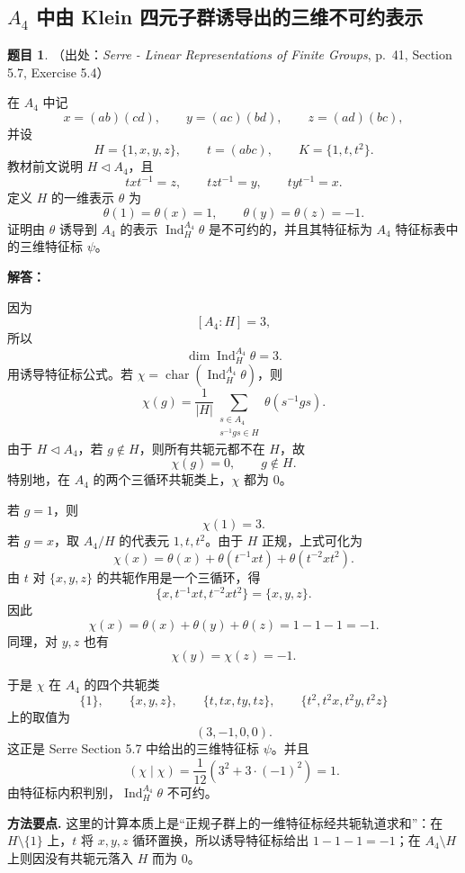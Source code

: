 \documentclass[a4paper]{ctexart}
\theoremstyle{definition}
\newtheorem{example}{题目}[section]
\theoremstyle{analysis}
\theoremstyle{plain}
\begin{document}
\subsection{\texorpdfstring{\(A_4\) 中由 Klein 四元子群诱导出的三维不可约表示}{A4 中由 Klein 四元子群诱导出的三维不可约表示}}\label{subsec:problem-serre-a4-induced-klein}

\begin{example}
（出处：\textit{Serre - Linear Representations of Finite Groups}, p.~41, Section 5.7, Exercise 5.4）

在 \(A_4\) 中记
\[
  x=(ab)(cd),\qquad y=(ac)(bd),\qquad z=(ad)(bc),
\]
并设
\[
  H=\{1,x,y,z\},\qquad t=(abc),\qquad K=\{1,t,t^2\}.
\]
教材前文说明 \(H\triangleleft A_4\)，且
\[
  txt^{-1}=z,\qquad tzt^{-1}=y,\qquad tyt^{-1}=x.
\]
定义 \(H\) 的一维表示 \(\theta\) 为
\[
  \theta(1)=\theta(x)=1,\qquad \theta(y)=\theta(z)=-1.
\]
证明由 \(\theta\) 诱导到 \(A_4\) 的表示 \(\operatorname{Ind}_H^{A_4}\theta\) 是不可约的，并且其特征标为 \(A_4\) 特征标表中的三维特征标 \(\psi\)。

\textbf{解答：}

因为
\[
  [A_4:H]=3,
\]
所以
\[
  \dim \operatorname{Ind}_H^{A_4}\theta=3.
\]
用诱导特征标公式。若 \(\chi=\operatorname{char}(\operatorname{Ind}_H^{A_4}\theta)\)，则
\[
  \chi(g)
  =
  \frac{1}{|H|}
  \sum_{\substack{s\in A_4\\ s^{-1}gs\in H}}
  \theta(s^{-1}gs).
\]
由于 \(H\triangleleft A_4\)，若 \(g\notin H\)，则所有共轭元都不在 \(H\)，故
\[
  \chi(g)=0,\qquad g\notin H.
\]
特别地，在 \(A_4\) 的两个三循环共轭类上，\(\chi\) 都为 \(0\)。

若 \(g=1\)，则
\[
  \chi(1)=3.
\]
若 \(g=x\)，取 \(A_4/H\) 的代表元 \(1,t,t^2\)。由于 \(H\) 正规，上式可化为
\[
  \chi(x)
  =
  \theta(x)+\theta(t^{-1}xt)+\theta(t^{-2}xt^2).
\]
由 \(t\) 对 \(\{x,y,z\}\) 的共轭作用是一个三循环，得
\[
  \{x,t^{-1}xt,t^{-2}xt^2\}=\{x,y,z\}.
\]
因此
\[
  \chi(x)=\theta(x)+\theta(y)+\theta(z)=1-1-1=-1.
\]
同理，对 \(y,z\) 也有
\[
  \chi(y)=\chi(z)=-1.
\]

于是 \(\chi\) 在 \(A_4\) 的四个共轭类
\[
  \{1\},\qquad \{x,y,z\},\qquad \{t,tx,ty,tz\},\qquad \{t^2,t^2x,t^2y,t^2z\}
\]
上的取值为
\[
  (3,-1,0,0).
\]
这正是 Serre Section 5.7 中给出的三维特征标 \(\psi\)。并且
\[
  (\chi\mid\chi)
  =
  \frac{1}{12}\left(3^2+3\cdot(-1)^2\right)
  =
  1.
\]
由特征标内积判别，\(\operatorname{Ind}_H^{A_4}\theta\) 不可约。

\textbf{方法要点.}
这里的计算本质上是“正规子群上的一维特征标经共轭轨道求和”：在 \(H\setminus\{1\}\) 上，\(t\) 将 \(x,y,z\) 循环置换，所以诱导特征标给出 \(1-1-1=-1\)；在 \(A_4\setminus H\) 上则因没有共轭元落入 \(H\) 而为 \(0\)。


\end{example}
\end{document}
